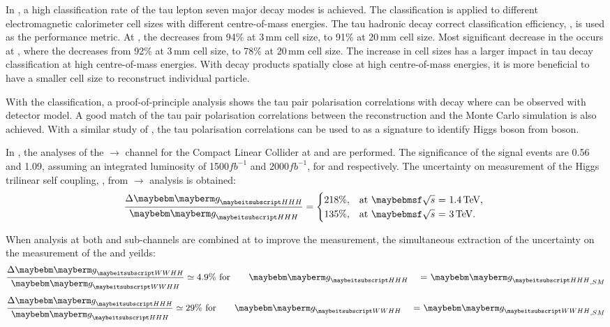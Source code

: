 In , a high classification rate of the tau lepton seven major decay modes is achieved. The classification is applied to different electromagnetic calorimeter cell sizes with different centre-of-mass energies. The tau hadronic decay correct classification efficiency, \tauHad,  is used as the performance metric. At , the \tauHad decreases from 94\% at 3\,mm cell size, to 91\% at 20\,mm cell size. Most significant decrease in the \tauHad occurs at  , where the \tauHad decreases from 92\% at 3\,mm cell size, to 78\% at 20\,mm cell size.  
The increase in \ECAL cell sizes has a larger impact in tau decay classification at high centre-of-mass energies. With decay products spatially close at high centre-of-mass energies, it is more beneficial to have a smaller \ECAL cell size to reconstruct individual particle.

With the classification, a proof-of-principle analysis shows the tau pair polarisation correlations with \ZToTauTau decay where \tauToPion can be observed with \ILD detector model. A good match of the tau pair polarisation correlations between the reconstruction and the Monte Carlo simulation is also achieved.   With a similar study of \HiggsToTauTau,  the tau polarisation correlations can be used to as a signature to identify  Higgs boson from \PZ boson.




 In , the analyses of the \eeToHH $\to$ \HepProcess{ \Pbottom \APbottom \PWplus \PWminus \Pnue \APnue} channel for the Compact Linear Collider at  and  are performed. The significance of the signal events are 0.56 and 1.09,  assuming an integrated luminosity of 1500$fb^{-1}$ and 2000$fb^{-1}$, for   and  respectively.  The uncertainty on measurement of the Higgs trilinear self coupling, \gHHH, from  \eeToHH $\to$ \HepProcess{ \Pbottom \APbottom \PWplus \PWminus \Pnue \APnue} analysis is obtained:
\begin{equation}
\frac{\Delta\gHHH}{\gHHH}=
\begin{cases}
  218\%, & \mbox{at \rootS{1.4}, }  \\
  135\%, & \mbox{at \rootS{3}}.
\end{cases}
\end{equation}

When analysis at both \eeToHHbbWW and \eeToHHbbbb sub-channels are combined at  to improve the measurement, the simultaneous extraction of the uncertainty on the measurement of the \gHHH and \gWWHH yeilds:
\begin{equation}
\frac{\Delta\gWWHH}{\gWWHH} \simeq 4.9\% \text{ for \gHHH = $\gHHH_{,SM}$}
\end{equation}
\begin{equation}
\frac{\Delta\gHHH}{\gHHH} \simeq 29\% \text{ for \gWWHH = $\gWWHH_{,SM}$}
\end{equation}
